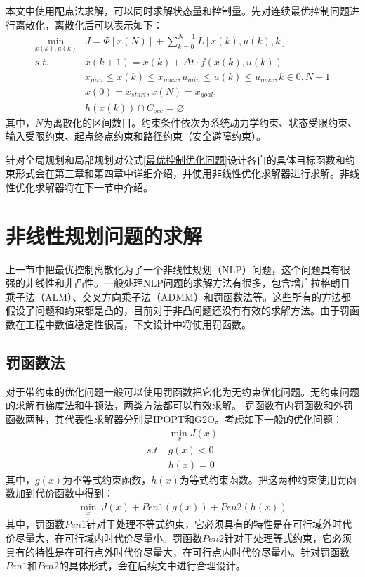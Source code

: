 \documentclass[master,academic]{ysuthesis} %
\begin{document}
	本文中使用配点法求解，可以同时求解状态量和控制量。先对连续最优控制问题进行离散化，离散化后可以表示如下：
	\begin{equation}
	\begin{aligned}
		\min_{x(k),u(k)} &J = \Phi[x(N)]+\sum_{k=0}^{N-1}L[x(k),u(k),k]\\
			s.t. \ \ \ &x(k+1) = x(k)+ \Delta t \cdot f(x(k),u(k))\\
			&x_{min}\le x(k) \le x_{max},u_{min}\le u(k) \le u_{max},k \in{0,N-1}\\
			&x(0)=x_{start},x(N)=x_{goal},\\
			&h(x(k))\cap C_{occ}=\varnothing 
	\end{aligned}
	\label{最优控制优化问题}
	\end{equation}
	其中，$N$为离散化的区间数目。约束条件依次为系统动力学约束、状态受限约束、输入受限约束、起点终点约束和路径约束（安全避障约束）。

	针对全局规划和局部规划对公式\ref{最优控制优化问题}设计各自的具体目标函数和约束形式会在第三章和第四章中详细介绍，并使用非线性优化求解器进行求解。非线性优化求解器将在下一节中介绍。

	\section{非线性规划问题的求解}
	上一节中把最优控制离散化为了一个非线性规划（NLP）问题，这个问题具有很强的非线性和非凸性。一般处理NLP问题的求解方法有很多，包含增广拉格朗日乘子法（ALM）、交叉方向乘子法（ADMM）和罚函数法等。这些所有的方法都假设了问题和约束都是凸的，目前对于非凸问题还没有有效的求解方法。由于罚函数在工程中数值稳定性很高，下文设计中将使用罚函数。
		\subsection{罚函数法}
		对于带约束的优化问题一般可以使用罚函数把它化为无约束优化问题。无约束问题的求解有梯度法和牛顿法，两类方法都可以有效求解。
		罚函数有内罚函数和外罚函数两种，其代表性求解器分别是IPOPT和G2O。考虑如下一般的优化问题：
		\begin{equation}
			\begin{aligned}
				&\min_{x} J(x)\\
					s.t. &g(x)<0\\
					&h(x)=0
			\end{aligned}
			\label{优化问题}
		\end{equation}
		其中，$g(x)$为不等式约束函数，$h(x)$为等式约束函数。把这两种约束使用罚函数加到代价函数中得到：
		\begin{equation}
			\begin{aligned}
				\min_{x} \ J(x)+Pen1(g(x))+Pen2(h(x))
			\end{aligned}
		\end{equation}
		其中，罚函数$Pen1$针对于处理不等式约束，它必须具有的特性是在可行域外时代价尽量大，在可行域内时代价尽量小。罚函数$Pen2$针对于处理等式约束，它必须具有的特性是在可行点外时代价尽量大，在可行点内时代价尽量小。针对罚函数$Pen1$和$Pen2$的具体形式，会在后续文中进行合理设计。
\end{document}
